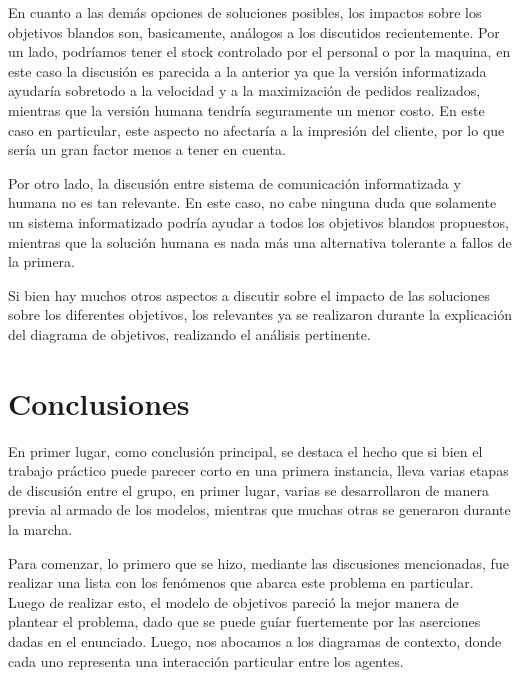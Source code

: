 \documentclass[a4paper,10pt]{article}
\begin{document}
\medskip

En cuanto a las dem\'as opciones de soluciones posibles, los impactos sobre los objetivos blandos son, basicamente, an\'alogos a los discutidos
recientemente. Por un lado, podr\'iamos tener el stock controlado por el personal o por la maquina, en este caso la discusi\'on es parecida a la anterior
ya que la versi\'on informatizada ayudar\'ia sobretodo a la velocidad y a la maximizaci\'on de pedidos realizados, mientras que la versi\'on humana
tendr\'ia seguramente un menor costo. En este caso en particular, este aspecto no afectar\'ia a la impresi\'on del cliente, por lo que ser\'ia un
gran factor menos a tener en cuenta.

Por otro lado, la discusi\'on entre sistema de comunicaci\'on informatizada y humana no es tan relevante. En este caso, no cabe ninguna duda que 
solamente un sistema informatizado podr\'ia ayudar a todos los objetivos blandos propuestos, mientras que la soluci\'on humana es nada m\'as una alternativa
tolerante a fallos de la primera.
\medskip

Si bien hay muchos otros aspectos a discutir sobre el impacto de las soluciones sobre los diferentes objetivos, los relevantes ya se realizaron
durante la explicaci\'on del diagrama de objetivos, realizando el an\'alisis pertinente.
 

\newpage
\section*{Conclusiones}

En primer lugar, como conclusi\'on principal, se destaca el hecho que si bien el trabajo pr\'actico puede parecer corto en una primera instancia,
lleva varias etapas de discusi\'on entre el grupo, en primer lugar, varias se desarrollaron de manera previa al armado de los modelos, mientras
que muchas otras se generaron durante la marcha.

Para comenzar, lo primero que se hizo, mediante las discusiones mencionadas, fue realizar una lista con los fen\'omenos que abarca este problema
en particular. Luego de realizar esto, el modelo de objetivos pareci\'o la mejor manera de plantear el problema, dado que se puede gu\'iar
fuertemente por las aserciones dadas en el enunciado. Luego, nos abocamos a los diagramas de contexto, donde cada uno representa una interacci\'on
particular entre los agentes.



\medskip
\end{document}
